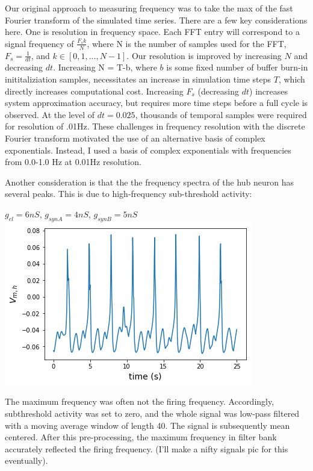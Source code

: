 \documentclass[11pt]{article}
\begin{document}
Our original approach to measuring frequency was to take the max of the fast Fourier transform of the simulated time series.  There are a few key considerations here.  One is resolution in frequency space.  Each FFT entry will correspond to a signal frequency of $\frac{F_s k}{N}$, where N is the number of samples used for the FFT, $F_s = \frac{1}{dt}$, and $k \in \left[0, 1, ..., N-1\right]$.  Our resolution is improved by increasing $N$ and decreasing $dt$.  Increasing N = T-b, where $b$ is some fixed number of buffer burn-in inititaliziation samples, necessitates an increase in simulation time steps $T$, which directly increases computational cost.  Increasing $F_s$ (decreasing $dt$) increases system approximation accuracy, but requires more time steps before a full cycle is observed.  At the level of $dt = 0.025$, thousands of temporal samples were required for resolution of .01Hz.  These challenges in frequency resolution with the discrete Fourier transform motivated the use of an alternative basis of complex exponentials.  Instead, I used a basis of complex exponentials with frequencies from 0.0-1.0 Hz at 0.01Hz resolution.  

Another consideration is that the the frequency spectra of the hub neuron has several peaks.  This is due to high-frequency sub-threshold activity:
\begin{center}
$g_{el} = 6nS$, $g_{synA} = 4nS$, $g_{synB} = 5nS$ \\
\includegraphics[scale=1.0]{figs/v_h_subthreshold.png}
\end{center}
The maximum frequency was often not the firing frequency.  Accordingly, subthreshold activity was set to zero, and the whole signal was low-pass filtered with a moving average window of length 40.  The signal is subsequently mean centered.  After this pre-processing, the maximum frequency in filter bank accurately reflected the firing frequency. (I'll make a nifty signals pic for this eventually).
\end{document}
